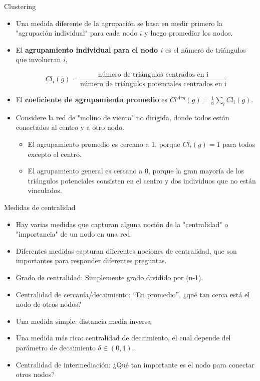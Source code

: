 \documentclass[11pt]{beamer}
\begin{document}
\begin{frame}{Clustering}
\begin{itemize}
 \small   \item Una medida diferente de la agrupación se basa en medir primero la "agrupación individual" para cada nodo $i$ y luego promediar los nodos.
\item El \textbf{agrupamiento individual para el nodo $i$} es el número de triángulos que involucran $i$, 

\begin{equation*}
Cl_i (g )=\frac{ \text{número de triángulos centrados en i}}{\text{número de triángulos potenciales centrados en i}}
\end{equation*}

\item El \textbf{coeficiente de agrupamiento promedio} es $Cl^{Avg} (g ) = \frac{1}{n} \sum_i Cl_i (g ) $.
\item Considere la red de "molino de viento" no dirigida, donde todos están conectados al centro y a otro nodo.
\begin{itemize}
    \item El agrupamiento promedio es cercano a 1, porque $Cl_i (g ) = 1$ para todos excepto el centro.
\item  El agrupamiento general es cercano a 0, porque la gran mayoría de los triángulos potenciales consisten en el centro y dos individuos que no están vinculados.
\end{itemize} 
\end{itemize}
\end{frame}

\begin{frame}{Medidas de centralidad}
    \begin{itemize}
        \item Hay varias medidas que capturan alguna noción de la "centralidad" o "importancia" de un nodo en una red.
\item Diferentes medidas capturan diferentes nociones de centralidad, que son importantes para responder diferentes preguntas.
\item Grado de centralidad: Simplemente grado dividido por (n-1).
\item Centralidad de cercanía/decaimiento: “En promedio”, ¿qué tan cerca está el nodo de otros nodos?
\item Una medida simple: distancia media inversa
\item Una medida más rica: centralidad de decaimiento, el cual depende del parámetro de decaimiento 
$\delta \in (0, 1)$.
\item Centralidad de intermediación: ¿Qué tan importante es el nodo para conectar otros nodos?
    \end{itemize}
\end{frame}
\end{document}
